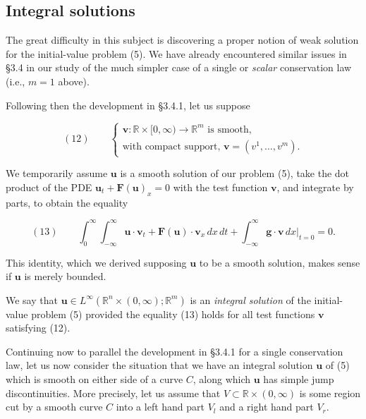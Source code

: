 \subsection{Integral solutions}\label{sec:integral-solutions-systems}

The great difficulty in this subject is discovering a proper notion of weak solution for the initial-value problem (5). We have already encountered similar issues in \S3.4 in our study of the much simpler case of a single or \textit{scalar} conservation law (i.e., $m=1$ above).

Following then the development in \S3.4.1, let us suppose

$$(12) \qquad \begin{cases} \mathbf{v}: \mathbb{R}\times[0,\infty) \to \mathbb{R}^m \text{ is smooth,} \\ \text{with compact support, } \mathbf{v}=(v^1,\ldots,v^m). \end{cases}$$

We temporarily assume $\mathbf{u}$ is a smooth solution of our problem (5), take the dot product of the PDE $\mathbf{u}_t + \mathbf{F}(\mathbf{u})_x = 0$ with the test function $\mathbf{v}$, and integrate by parts, to obtain the equality

$$(13) \qquad \int_0^\infty \int_{-\infty}^\infty \mathbf{u}\cdot\mathbf{v}_t + \mathbf{F}(\mathbf{u})\cdot\mathbf{v}_x \, dx\,dt + \int_{-\infty}^\infty \mathbf{g}\cdot\mathbf{v}\,dx\Big|_{t=0} = 0.$$

This identity, which we derived supposing $\mathbf{u}$ to be a smooth solution, makes sense if $\mathbf{u}$ is merely bounded.

\begin{definition}
\label{def:integral-solution-system}
We say that $\mathbf{u}\in L^\infty(\mathbb{R}^n\times(0,\infty);\mathbb{R}^m)$ is an \textit{integral solution} of the initial-value problem (5) provided the equality (13) holds for all test functions $\mathbf{v}$ satisfying (12).
\end{definition}

Continuing now to parallel the development in \S3.4.1 for a single conservation law, let us now consider the situation that we have an integral solution $\mathbf{u}$ of (5) which is smooth on either side of a curve $C$, along which $\mathbf{u}$ has simple jump discontinuities. More precisely, let us assume that $V \subset \mathbb{R}\times(0,\infty)$ is some region cut by a smooth curve $C$ into a left hand part $V_l$ and a right hand part $V_r$.

